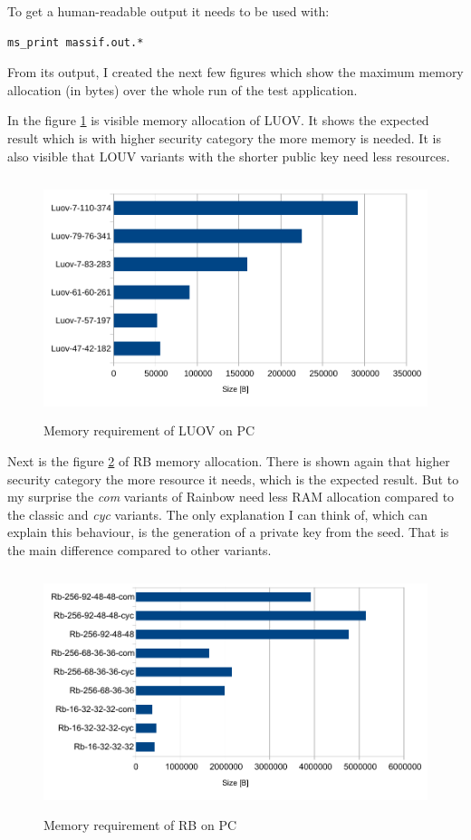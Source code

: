 \documentclass[thesis=M,english]{FITthesis}[2019/12/23]
\begin{document}
\noindent
To get a human-readable output it needs to be used with:
\begin{lstlisting}[frame=single]
ms_print massif.out.*
\end{lstlisting}
\noindent
From its output, I created the next few figures which show the maximum memory allocation (in bytes) over the whole run of the test application.

\bigskip
\noindent
In the figure \ref{mem-pc-luov} is visible memory allocation of LUOV. It shows the expected result which is with higher security category the more memory is needed. It is also visible that LOUV variants with the shorter public key need less resources.

\begin{figure}[H]
\centering
\includegraphics[width=13cm,height=7cm]{images/mem-pc-luov.pdf}
\caption{Memory requirement of LUOV on PC}
\label{mem-pc-luov}
\end{figure}

\noindent
Next is the figure \ref{mem-pc-rb} of RB memory allocation. There is shown again that higher security category the more resource it needs, which is the expected result. But to my surprise the \textit{com} variants of Rainbow need less RAM allocation compared to the classic and \textit{cyc} variants. The only explanation I can think of, which can explain this behaviour, is the generation of a private key from the seed. That is the main difference compared to other variants.
\begin{figure}[H]
\centering
\includegraphics[width=13cm,height=7cm]{images/mem-pc-rb.pdf}
\caption{Memory requirement of RB on PC}
\label{mem-pc-rb}
\end{figure}
\end{document}
